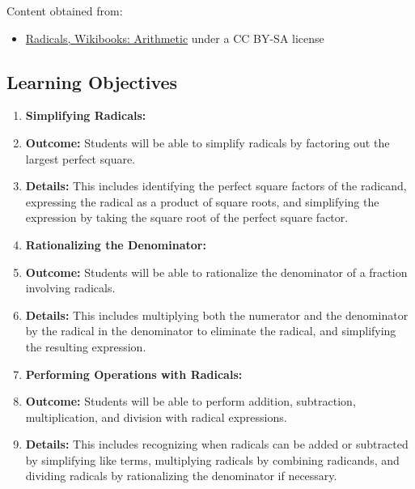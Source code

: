Content obtained from:



\begin{itemize}
    \item \href{https://en.wikibooks.org/wiki/Arithmetic/Radicals}{Radicals, Wikibooks: Arithmetic} under a CC BY-SA license
\end{itemize}


\subsection{Learning Objectives}
\label{ssec:lear-fe6e}


\begin{enumerate}
    \item \textbf{Simplifying Radicals:}
    \item \textbf{Outcome:} Students will be able to simplify radicals by factoring out the largest perfect square.
    \item \textbf{Details:} This includes identifying the perfect square factors of the radicand, expressing the radical as a product of square roots, and simplifying the expression by taking the square root of the perfect square factor.
    \item \textbf{Rationalizing the Denominator:}
    \item \textbf{Outcome:} Students will be able to rationalize the denominator of a fraction involving radicals.
    \item \textbf{Details:} This includes multiplying both the numerator and the denominator by the radical in the denominator to eliminate the radical, and simplifying the resulting expression.
    \item \textbf{Performing Operations with Radicals:}
    \item \textbf{Outcome:} Students will be able to perform addition, subtraction, multiplication, and division with radical expressions.
    \item \textbf{Details:} This includes recognizing when radicals can be added or subtracted by simplifying like terms, multiplying radicals by combining radicands, and dividing radicals by rationalizing the denominator if necessary.
\end{enumerate}


